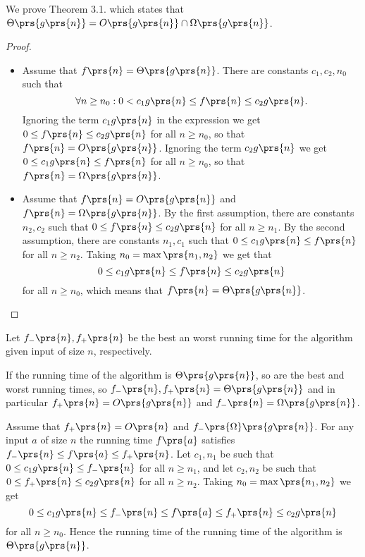 \documentclass[oneside]{scrbook}
\theoremstyle{definition}
\begin{document}
\begin{exercise}
    We prove Theorem 3.1. which states that $\Theta\prs{g\prs{n}} = O\prs{g\prs{n}} \cap \Omega\prs{g\prs{n}}$.

    \begin{proof}
        \begin{itemize}
            \item Assume that $f\prs{n} = \Theta\prs{g\prs{n}}$.
            There are constants $c_1, c_2, n_0$ such that
            \[\forall n \geq n_0: 0 < c_1 g\prs{n} \leq f\prs{n} \leq c_2 g\prs{n} \text{.}\]
            Ignoring the term $c_1 g \prs{n}$ in the expression we get $0 \leq f\prs{n} \leq c_2 g\prs{n}$ for all $n \geq n_0$, so that $f\prs{n} = O\prs{g\prs{n}}$.
            Ignoring the term $c_2 g\prs{n}$ we get $0 \leq c_1 g\prs{n} \leq f\prs{n}$ for all $n \geq n_0$, so that $f\prs{n} = \Omega\prs{g\prs{n}}$.

            \item Assume that $f\prs{n} = O\prs{g\prs{n}}$ and $f\prs{n} = \Omega\prs{g\prs{n}}$. By the first assumption, there are constants $n_2, c_2$ such that $0 \leq f\prs{n} \leq c_2 g\prs{n}$ for all $n \geq n_1$.
            By the second assumption, there are constants $n_1, c_1$ such that $0 \leq c_1 g\prs{n} \leq f\prs{n}$ for all $n \geq n_2$. Taking $n_0 = \max\prs{n_1, n_2}$ we get that
            \[0 \leq c_1 g\prs{n} \leq f\prs{n} \leq c_2 g\prs{n}\]
            for all $n \geq n_0$, which means that $f\prs{n} = \Theta\prs{g\prs{n}}$.
        \end{itemize}
    \end{proof}
\end{exercise}

\begin{exercise}
    Let $f_-\prs{n}, f_+\prs{n}$ be the best an worst running time for the algorithm given input of size $n$, respectively.

    If the running time of the algorithm is $\Theta\prs{g\prs{n}}$, so are the best and worst running times, so $f_-\prs{n}, f_+\prs{n} = \Theta\prs{g\prs{n}}$ and in particular $f_+\prs{n} = O\prs{g\prs{n}}$ and $f_-\prs{n} = \Omega\prs{g\prs{n}}$.

    Assume that $f_+\prs{n} = O\prs{n}$ and $f_-\prs{\Omega}\prs{g\prs{n}}$. For any input $a$ of size $n$ the running time $f\prs{a}$ satisfies $f_-\prs{n} \leq f\prs{a} \leq f_+\prs{n}$. Let $c_1, n_1$ be such that $0 \leq c_1 g\prs{n} \leq f_-\prs{n}$ for all $n \geq n_1$, and let $c_2, n_2$ be such that $0 \leq f_+\prs{n} \leq c_2 g\prs{n}$ for all $n \geq n_2$. Taking $n_0 = \max\prs{n_1, n_2}$ we get
    \[0 \leq c_1 g\prs{n} \leq f_-\prs{n} \leq f\prs{a} \leq f_+\prs{n} \leq c_2 g\prs{n}\]
    for all $n \geq n_0$. Hence the running time of the running time of the algorithm is $\Theta\prs{g\prs{n}}$.
\end{exercise}
\end{document}
